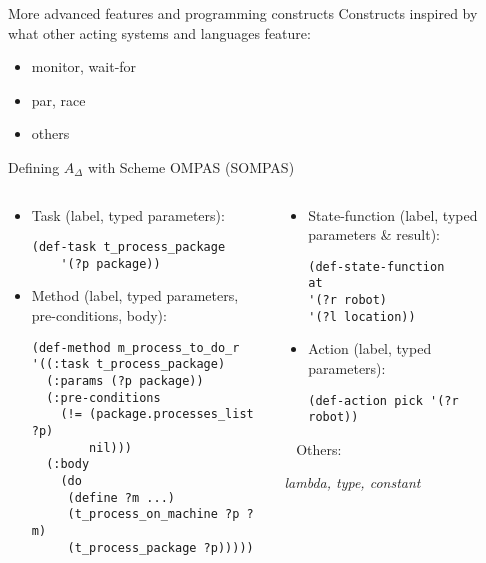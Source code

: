 \begin{frame}{More advanced features and programming constructs}
    Constructs inspired by what other acting systems and languages feature:
    \begin{itemize}
        \item monitor, wait-for
        \item par, race
        \item others
    \end{itemize}
\end{frame}

\begin{frame}[t,fragile]{Defining $A_\Delta$ with Scheme OMPAS (SOMPAS)}
    \setlength{\leftmargini}{0pt}
    \begin{columns}
        \begin{column}{0.5\textwidth}
            \begin{itemize}
                \footnotesize
                \item Task (label, typed parameters):
                \tiny
                \begin{lstlisting}
(def-task t_process_package
    '(?p package))
                \end{lstlisting}
                \footnotesize
                \pause
                \item Method (label, typed parameters, pre-conditions, body):
                \tiny
                \begin{lstlisting}
(def-method m_process_to_do_r
'((:task t_process_package)
  (:params (?p package))
  (:pre-conditions
    (!= (package.processes_list ?p)
        nil)))
  (:body
    (do
     (define ?m ...)
     (t_process_on_machine ?p ?m)
     (t_process_package ?p)))))    
                \end{lstlisting}
            \end{itemize}
        \end{column}
\pause
        \begin{column}{0.5\textwidth}
            \begin{itemize}
                \pause
            \footnotesize
            \item State-function (label, typed parameters \& result):
            \tiny
            \begin{lstlisting}
(def-state-function
at
'(?r robot)
'(?l location))
            \end{lstlisting}
            \pause
            \footnotesize
            \item Action (label, typed parameters):
            \tiny
            \begin{lstlisting}
(def-action pick '(?r robot))
                \end{lstlisting}
            \end{itemize}

    \pause
            ~
        \normalsize
        Others:
        
        \textit{lambda, type, constant}
        \end{column}

    \end{columns}
\end{frame}
